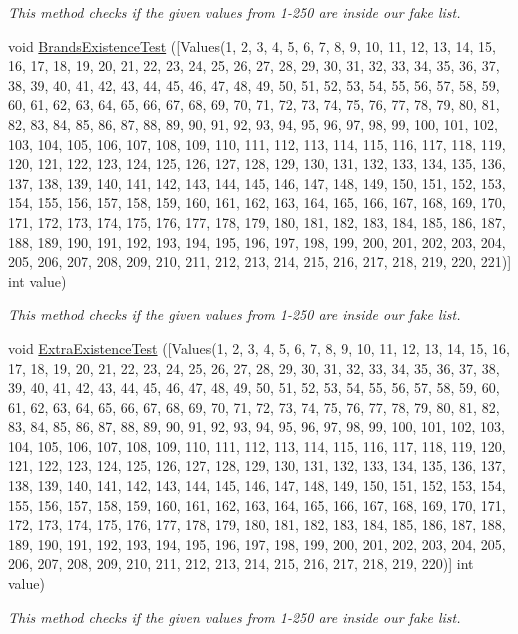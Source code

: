 \begin{DoxyCompactItemize}
\begin{DoxyCompactList}\small\item\em This method checks if the given values from 1-\/250 are inside our fake list. \end{DoxyCompactList}\item 
void \mbox{\hyperlink{class_car_shop_1_1_logic_1_1_tests_1_1_logic_test_a545b9aabfa60fc520d1b05e588619560}{Brands\+Existence\+Test}} (\mbox{[}Values(1, 2, 3, 4, 5, 6, 7, 8, 9, 10, 11, 12, 13, 14, 15, 16, 17, 18, 19, 20, 21, 22, 23, 24, 25, 26, 27, 28, 29, 30, 31, 32, 33, 34, 35, 36, 37, 38, 39, 40, 41, 42, 43, 44, 45, 46, 47, 48, 49, 50, 51, 52, 53, 54, 55, 56, 57, 58, 59, 60, 61, 62, 63, 64, 65, 66, 67, 68, 69, 70, 71, 72, 73, 74, 75, 76, 77, 78, 79, 80, 81, 82, 83, 84, 85, 86, 87, 88, 89, 90, 91, 92, 93, 94, 95, 96, 97, 98, 99, 100, 101, 102, 103, 104, 105, 106, 107, 108, 109, 110, 111, 112, 113, 114, 115, 116, 117, 118, 119, 120, 121, 122, 123, 124, 125, 126, 127, 128, 129, 130, 131, 132, 133, 134, 135, 136, 137, 138, 139, 140, 141, 142, 143, 144, 145, 146, 147, 148, 149, 150, 151, 152, 153, 154, 155, 156, 157, 158, 159, 160, 161, 162, 163, 164, 165, 166, 167, 168, 169, 170, 171, 172, 173, 174, 175, 176, 177, 178, 179, 180, 181, 182, 183, 184, 185, 186, 187, 188, 189, 190, 191, 192, 193, 194, 195, 196, 197, 198, 199, 200, 201, 202, 203, 204, 205, 206, 207, 208, 209, 210, 211, 212, 213, 214, 215, 216, 217, 218, 219, 220, 221)\mbox{]} int value)
\begin{DoxyCompactList}\small\item\em This method checks if the given values from 1-\/250 are inside our fake list. \end{DoxyCompactList}\item 
void \mbox{\hyperlink{class_car_shop_1_1_logic_1_1_tests_1_1_logic_test_a50d727a4f84795fa569179318dc80322}{Extra\+Existence\+Test}} (\mbox{[}Values(1, 2, 3, 4, 5, 6, 7, 8, 9, 10, 11, 12, 13, 14, 15, 16, 17, 18, 19, 20, 21, 22, 23, 24, 25, 26, 27, 28, 29, 30, 31, 32, 33, 34, 35, 36, 37, 38, 39, 40, 41, 42, 43, 44, 45, 46, 47, 48, 49, 50, 51, 52, 53, 54, 55, 56, 57, 58, 59, 60, 61, 62, 63, 64, 65, 66, 67, 68, 69, 70, 71, 72, 73, 74, 75, 76, 77, 78, 79, 80, 81, 82, 83, 84, 85, 86, 87, 88, 89, 90, 91, 92, 93, 94, 95, 96, 97, 98, 99, 100, 101, 102, 103, 104, 105, 106, 107, 108, 109, 110, 111, 112, 113, 114, 115, 116, 117, 118, 119, 120, 121, 122, 123, 124, 125, 126, 127, 128, 129, 130, 131, 132, 133, 134, 135, 136, 137, 138, 139, 140, 141, 142, 143, 144, 145, 146, 147, 148, 149, 150, 151, 152, 153, 154, 155, 156, 157, 158, 159, 160, 161, 162, 163, 164, 165, 166, 167, 168, 169, 170, 171, 172, 173, 174, 175, 176, 177, 178, 179, 180, 181, 182, 183, 184, 185, 186, 187, 188, 189, 190, 191, 192, 193, 194, 195, 196, 197, 198, 199, 200, 201, 202, 203, 204, 205, 206, 207, 208, 209, 210, 211, 212, 213, 214, 215, 216, 217, 218, 219, 220)\mbox{]} int value)
\begin{DoxyCompactList}\small\item\em This method checks if the given values from 1-\/250 are inside our fake list. \end{DoxyCompactList}\end{DoxyCompactItemize}


